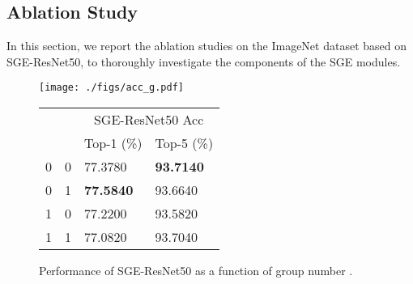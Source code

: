 \documentclass{article}
\begin{document}
	
	\subsection{Ablation Study}
	In this section, we report the ablation studies on the ImageNet dataset based on SGE-ResNet50, to thoroughly investigate the components of the SGE modules.
	
	
	
	\begin{figure}	
		\small
\renewcommand\arraystretch{1.2}
		\newcommand{\tabincell}[2]{\begin{tabular}{@{}#1@{}}#2\end{tabular}}
		\begin{minipage}[b]{0.3\linewidth}
			\vspace{+0pt}
			\texttt{[image: ./figs/acc\_g.pdf]}
			\vspace{-6pt}
			\caption{Performance of SGE-ResNet50 as a function of group number .}\label{fig_1a}
		\end{minipage}
		\quad
		\begin{minipage}[b]{0.34\linewidth}
			\centering
			\vspace{-7pt}
			\begin{tabular}{l|l|l|l}
				\hline
				\multirow{2}{*}{} & \multicolumn{1}{c|}{\multirow{2}{*}{}} & \multicolumn{2}{c}{SGE-ResNet50 Acc}                                             \\ \cline{3-4} 
				& \multicolumn{1}{c|}{}                         & \multicolumn{1}{c|}{Top-1 (\%)} & \multicolumn{1}{c}{Top-5 (\%)} \\ \hline
				0   & 0    & 77.3780 &\bf  93.7140    \\ \hline
				0   & 1    &\bf 77.5840 &  93.6640    \\ \hline
				1   & 0    & 77.2200 &  93.5820    \\ \hline
				1   & 1    & 77.0820 &  93.7040    \\ \hline \end{tabular}
			\vspace{+0pt}
			\label{tab_1b}
		\end{minipage}
		\quad
		\begin{minipage}[b]{0.3\linewidth}


\end{minipage}
\end{figure}
\end{document}

